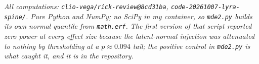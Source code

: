 \documentclass[11pt]{article}
\theoremstyle{definition}
\begin{document}
\vspace{1em}
\noindent\textit{All computations: \texttt{clio-vega/rick-review@8cd31ba},
\texttt{code-20261007-lyra-spine/}. Pure Python and NumPy; no SciPy in my container,
so \texttt{mde2.py} builds its own normal quantile from \texttt{math.erf}. The first
version of that script reported zero power at every effect size because the
latent-normal injection was attenuated to nothing by thresholding at a $p\approx0.094$
tail; the positive control in \texttt{mde2.py} is what caught it, and it is in the
repository.}
\end{document}
